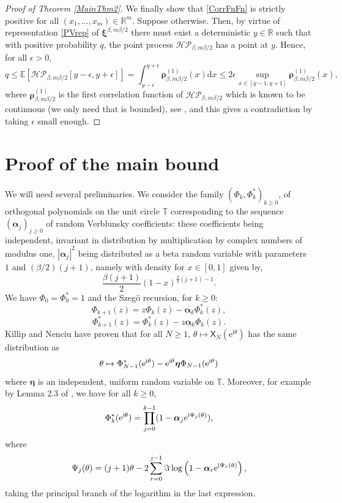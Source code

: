\documentclass[]{article}
\begin{document}
\begin{proof} [Proof of Theorem \ref{MainThm2}]
We finally show that \eqref{CorrFnFn} is strictly positive for all $(x_1,\dots,x_m)\in \mathbb{R}^m$. Suppose otherwise. Then, by virtue of representation \eqref{PVrep} of $\boldsymbol{\xi}^{\beta,m\beta/2}$ there must exist a deterministic $y\in \mathbb{R}$ such that with positive probability $q$, the point process $\mathcal{HP}_{\beta,m\beta/2}$ has a point at $y$. Hence, for all $\epsilon >0$,
\begin{equation*}
q \le \mathbb{E}\left[\mathcal{HP}_{\beta,m\beta/2}\left[y-\epsilon,y+\epsilon\right]\right]=\int_{y-\epsilon}^{y+\epsilon}\boldsymbol{\rho}_{\beta,m\beta/2}^{(1)}(x)\mathrm{d}x \le 2\epsilon \sup_{x\in [y-1,y+1] } \boldsymbol{\rho}_{\beta,m\beta/2}^{(1)}(x),
\end{equation*}
where $\boldsymbol{\rho}_{\beta,m\beta/2}^{(1)}$ is the first correlation function of $\mathcal{HP}_{\beta,m\beta/2}$ which is known to be continuous (we only need that is bounded), see \cite{qu2025pair}, and this gives a contradiction by taking $\epsilon$ small enough.
\end{proof}


\section{Proof of the main bound}\label{SectionMainBound}
We will need several preliminaries. We consider the 
family $(\Phi_k, \Phi^*_k)_{k \geq 0}$, 
of orthogonal polynomials on the unit circle $\mathbb{T}$
corresponding to the sequence $(\boldsymbol{\alpha}_j)_{j \geq 0}$ of  random Verblunsky coefficients: these coefficients being independent, invariant in distribution by multiplication by complex numbers of modulus one, $|\boldsymbol{\alpha}_j|^2$ being 
distributed as a beta random variable with parameters $1$ and $(\beta/2)(j+1)$, namely with density for $x\in[0,1]$ given by,
\begin{equation*}
\frac{\beta(j+1)}{2}(1-x)^{\frac{\beta}{2}(j+1)-1}.
\end{equation*}
We have $\Phi_0 = \Phi^*_0 = 1$ and the Szeg\"o recursion, for $k\ge 0$: 
$$\Phi_{k+1} (z) = z \Phi_k(z) - \overline{\boldsymbol{\alpha}_k} \Phi^*_k(z),$$
$$\Phi^*_{k+1} (z) = \Phi^*_k (z) - z \boldsymbol{\alpha}_k \Phi_k(z). $$
Killip and Nenciu \cite{KillipNenciu}
 have proven that for all $N \geq 1$, 
$\theta\mapsto \mathsf{X}_N(\mathrm{e}^{\mathrm{i}\theta})$ has the same distribution as 
$$\theta \mapsto \Phi^*_{N-1} (\mathrm{e}^{\textnormal{i}\theta })- \mathrm{e}^{\textnormal{i}\theta } \boldsymbol{\eta} \Phi_{N-1} (\mathrm{e}^{\textnormal{i}\theta })$$
where $\boldsymbol{\eta}$ is an independent, uniform random variable on $\mathbb{T}$.
Moreover, for example by Lemma 2.3 of \cite{ChhaibiMadauleNajnudel},  we have for all 
$k \geq 0$, 
$$\Phi_k^*(\mathrm{e}^{\textnormal{i} \theta}) 
= \prod_{j=0}^{k-1} (1 -\boldsymbol{\alpha}_j \mathrm{e}^{\textnormal{i}\Psi_j(\theta)}),$$
where 
$$\Psi_{j} (\theta) = (j+1) \theta  -  
2 \sum_{r = 0}^{j-1} \Im \log \left(1 - \boldsymbol{\alpha}_r \mathrm{e}^{\textnormal{i} \Psi_r(\theta)}\right),$$
taking the principal branch of the logarithm in the last expression. 
\end{document}
